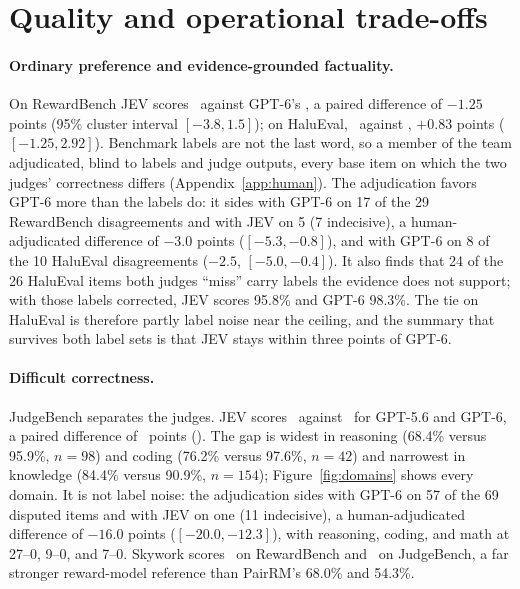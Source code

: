 \documentclass[11pt]{article}
\begin{document}
\section{Quality and operational trade-offs}
\label{sec:quality}
\begin{table}[t]
\centering\small\setlength{\tabcolsep}{4pt}

\caption{Base-order accuracy (\%). Invalid outcomes count as errors. Validity covers all applicable base tasks; PairRM and Skywork support preference pairs here. $\dagger$: initial-window quality; $\ddagger$: follow-up addition. Local Qwen uses non-thinking inference; hosted reasoning models use low effort except Qwen3.6 (default). Skywork scalar-score ties receive half-credit.}
\label{tab:quality}
\end{table}

\paragraph{Ordinary preference and evidence-grounded factuality.}
On RewardBench JEV scores \expJevRB\ against GPT-6's \expGptSixRB, a paired difference of $-1.25$ points (95\% cluster interval $[-3.8,1.5]$); on HaluEval, \expJevHA\ against \expGptSixHA, $+0.83$ points ($[-1.25,2.92]$). Benchmark labels are not the last word, so a member of the team adjudicated, blind to labels and judge outputs, every base item on which the two judges' correctness differs (Appendix~\ref{app:human}). The adjudication favors GPT-6 more than the labels do: it sides with GPT-6 on 17 of the 29 RewardBench disagreements and with JEV on 5 (7 indecisive), a human-adjudicated difference of $-3.0$ points ($[-5.3,-0.8]$), and with GPT-6 on 8 of the 10 HaluEval disagreements ($-2.5$, $[-5.0,-0.4]$). It also finds that 24 of the 26 HaluEval items both judges ``miss'' carry labels the evidence does not support; with those labels corrected, JEV scores 95.8\% and GPT-6 98.3\%. The tie on HaluEval is therefore partly label noise near the ceiling, and the summary that survives both label sets is that JEV stays within three points of GPT-6.

\paragraph{Difficult correctness.}
JudgeBench separates the judges. JEV scores \expJevJB\ against \expGptSixJB\ for GPT-5.6 and GPT-6, a paired difference of \expJevSixDelta\ points (\expJevSixCI). The gap is widest in reasoning (68.4\% versus 95.9\%, $n=98$) and coding (76.2\% versus 97.6\%, $n=42$) and narrowest in knowledge (84.4\% versus 90.9\%, $n=154$); Figure~\ref{fig:domains} shows every domain. It is not label noise: the adjudication sides with GPT-6 on 57 of the 69 disputed items and with JEV on one (11 indecisive), a human-adjudicated difference of $-16.0$ points ($[-20.0,-12.3]$), with reasoning, coding, and math at 27--0, 9--0, and 7--0. Skywork scores \revSkyRB\ on RewardBench and \revSkyJB\ on JudgeBench, a far stronger reward-model reference than PairRM's 68.0\% and 54.3\%.
\end{document}
